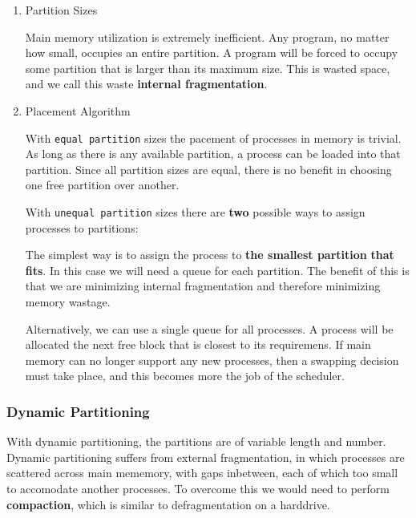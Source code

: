 \documentclass[11pt]{article}
\begin{document}
\begin{enumerate}
\item Partition Sizes
\label{sec:orgheadline7}

Main memory utilization is extremely inefficient. Any program, 
no matter how small, occupies an entire partition. A program
will be forced to occupy some partition that is larger than
its maximum size. This is wasted space, and we call this waste
\textbf{internal fragmentation}.

\item Placement Algorithm
\label{sec:orgheadline8}

With \texttt{equal partition} sizes the pacement of processes in memory
is trivial. As long as there is any available partition, a process
can be loaded into that partition. Since all partition sizes are
equal, there is no benefit in choosing one free partition over
another.

With \texttt{unequal partition} sizes there are \textbf{two} possible ways to assign
processes to partitions: 

The simplest way is to assign the process to \textbf{the smallest partition} 
\textbf{that fits}. In this case we will need a queue for each partition. The
benefit of this is that we are minimizing internal fragmentation and
therefore minimizing memory wastage. 

Alternatively, we can use a single queue for all processes. A process
will be allocated the next free block that is closest to its requiremens.
If main memory can no longer support any new processes, then a swapping
decision must take place, and this becomes more the job of the scheduler.
\end{enumerate}

\subsubsection{Dynamic Partitioning}
\label{sec:orgheadline15}

With dynamic partitioning, the partitions are of variable 
length and number. Dynamic partitioning suffers from external
fragmentation, in which processes are scattered across main 
mememory, with gaps inbetween, each of which too small to accomodate
another processes. To overcome this we would need to perform
\textbf{compaction}, which is similar to defragmentation on a harddrive.
\end{document}
